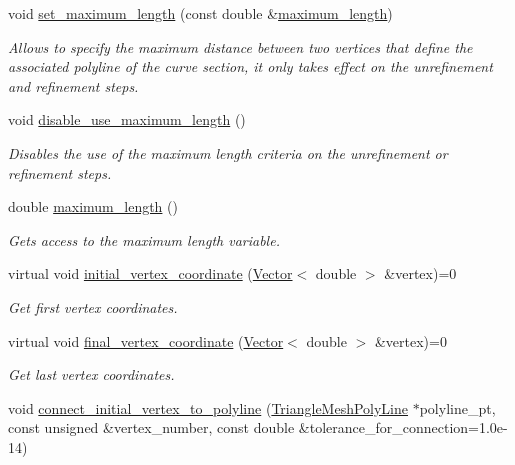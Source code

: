 \begin{DoxyCompactItemize}
void \hyperlink{classoomph_1_1TriangleMeshCurveSection_a5bb05bb4547fd20b4cfc1c0c5253bc0f}{set\+\_\+maximum\+\_\+length} (const double \&\hyperlink{classoomph_1_1TriangleMeshCurveSection_aee6ab6dbfd4e2f63da41bb8f66a43f53}{maximum\+\_\+length})
\begin{DoxyCompactList}\small\item\em Allows to specify the maximum distance between two vertices that define the associated polyline of the curve section, it only takes effect on the unrefinement and refinement steps. \end{DoxyCompactList}\item 
void \hyperlink{classoomph_1_1TriangleMeshCurveSection_afcf00be8498fb9b47a69b18d20fca6a1}{disable\+\_\+use\+\_\+maximum\+\_\+length} ()
\begin{DoxyCompactList}\small\item\em Disables the use of the maximum length criteria on the unrefinement or refinement steps. \end{DoxyCompactList}\item 
double \hyperlink{classoomph_1_1TriangleMeshCurveSection_aee6ab6dbfd4e2f63da41bb8f66a43f53}{maximum\+\_\+length} ()
\begin{DoxyCompactList}\small\item\em Gets access to the maximum length variable. \end{DoxyCompactList}\item 
virtual void \hyperlink{classoomph_1_1TriangleMeshCurveSection_a08c60883b595a52280c486badf8a4210}{initial\+\_\+vertex\+\_\+coordinate} (\hyperlink{classoomph_1_1Vector}{Vector}$<$ double $>$ \&vertex)=0
\begin{DoxyCompactList}\small\item\em Get first vertex coordinates. \end{DoxyCompactList}\item 
virtual void \hyperlink{classoomph_1_1TriangleMeshCurveSection_aa5bbea1d7c1157f25d3b93101ac4b80f}{final\+\_\+vertex\+\_\+coordinate} (\hyperlink{classoomph_1_1Vector}{Vector}$<$ double $>$ \&vertex)=0
\begin{DoxyCompactList}\small\item\em Get last vertex coordinates. \end{DoxyCompactList}\item 
void \hyperlink{classoomph_1_1TriangleMeshCurveSection_a32e53dc2a830784397230e92f73f6191}{connect\+\_\+initial\+\_\+vertex\+\_\+to\+\_\+polyline} (\hyperlink{classoomph_1_1TriangleMeshPolyLine}{Triangle\+Mesh\+Poly\+Line} $\ast$polyline\+\_\+pt, const unsigned \&vertex\+\_\+number, const double \&tolerance\+\_\+for\+\_\+connection=1.\+0e-\/14)

\end{DoxyCompactItemize}
